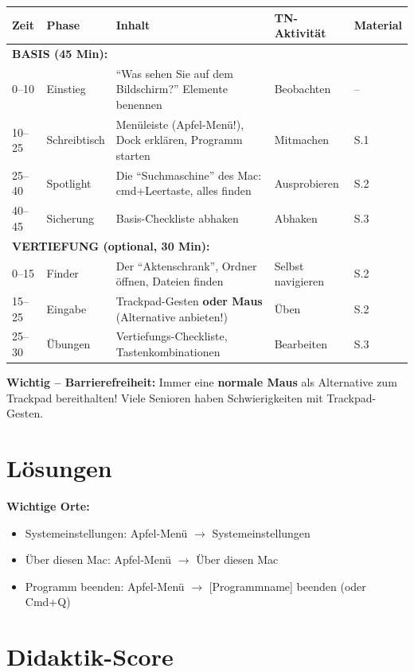 \documentclass[11pt,a4paper]{article}
\begin{document}
\begin{longtable}{|p{1cm}|p{2cm}|p{5cm}|p{3cm}|p{2cm}|}
\hline
\textbf{Zeit} & \textbf{Phase} & \textbf{Inhalt} & \textbf{TN-Aktivität} & \textbf{Material} \\
\hline
\multicolumn{5}{|l|}{\textbf{BASIS (45 Min):}} \\
\hline
0--10 & Einstieg & ``Was sehen Sie auf dem Bildschirm?'' Elemente benennen & Beobachten & -- \\
\hline
10--25 & Schreibtisch & Menüleiste (Apfel-Menü!), Dock erklären, Programm starten & Mitmachen & S.1 \\
\hline
25--40 & Spotlight & Die ``Suchmaschine'' des Mac: cmd+Leertaste, alles finden & Ausprobieren & S.2 \\
\hline
40--45 & Sicherung & Basis-Checkliste abhaken & Abhaken & S.3 \\
\hline
\multicolumn{5}{|l|}{\textbf{VERTIEFUNG (optional, 30 Min):}} \\
\hline
0--15 & Finder & Der ``Aktenschrank'', Ordner öffnen, Dateien finden & Selbst navigieren & S.2 \\
\hline
15--25 & Eingabe & Trackpad-Gesten \textbf{oder Maus} (Alternative anbieten!) & Üben & S.2 \\
\hline
25--30 & Übungen & Vertiefungs-Checkliste, Tastenkombinationen & Bearbeiten & S.3 \\
\hline
\end{longtable}

\textbf{Wichtig -- Barrierefreiheit:} Immer eine \textbf{normale Maus} als Alternative zum Trackpad bereithalten! Viele Senioren haben Schwierigkeiten mit Trackpad-Gesten.

\section{Lösungen}

\textbf{Wichtige Orte:}
\begin{itemize}
    \item Systemeinstellungen: Apfel-Menü $\rightarrow$ Systemeinstellungen
    \item Über diesen Mac: Apfel-Menü $\rightarrow$ Über diesen Mac
    \item Programm beenden: Apfel-Menü $\rightarrow$ [Programmname] beenden (oder Cmd+Q)
\end{itemize}

\section{Didaktik-Score}
\end{document}
